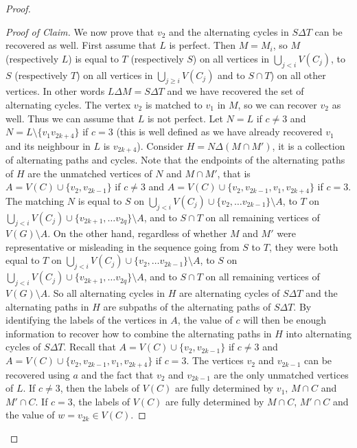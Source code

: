 \documentclass[11pt,a4paper]{article}
\theoremstyle{definition}
\newenvironment{poc}{\begin{proof}[Proof of
    Claim]\renewcommand*{\qedsymbol}{$\blacksquare$}}{\end{proof}}
\begin{document}
\begin{proof}
\begin{poc}
    We now prove that $v_2$ and the alternating cycles in $S \Delta T$ can be
    recovered as well. First assume that $L$ is perfect. Then $M = M_i$, so $M$
    (respectively $L$) is equal to $T$ (respectively $S$) on all vertices in
    $\bigcup_{j<i} V(C_j)$, to $S$ (respectively $T$) on all vertices in
    $\bigcup_{j\ge i} V(C_j)$ and to $S \cap T$) on all other vertices. In other
    words $L \Delta M = S \Delta T$ and we have recovered the set of alternating
    cycles. The vertex $v_2$ is matched to $v_1$ in $M$, so we can recover $v_2$
    as well. Thus we can assume that $L$ is not perfect. Let $N=L$ if $c \neq 3$
    and $N=L \setminus \{v_1v_{2k+4}\}$ if $c=3$ (this is well defined as we
    have already recovered $v_1$ and its neighbour in $L$ is
    $v_{2k+4}$). Consider $H = N\Delta (M \cap M')$, it is a collection of
    alternating paths and cycles. Note that the endpoints of the alternating
    paths of $H$ are the unmatched vertices of $N$ and $M \cap M'$, that is
    $A = V(C) \cup \{v_2,v_{2k-1}\}$ if $c \neq 3$ and
    $A = V(C) \cup \{v_2,v_{2k-1}, v_1, v_{2k+4}\}$ if $c=3$. The matching $N$
    is equal to $S$ on
    $\bigcup_{j<i} V(C_j) \cup \{v_2, \dots v_{2k-1}\} \setminus A$, to $T$ on
    $\bigcup_{j<i} V(C_j) \cup \{v_{2k+1}, \dots v_{2q}\} \setminus A$, and to
    $S \cap T$ on all remaining vertices of $V(G) \setminus A$. On the other
    hand, regardless of whether $M$ and $M'$ were representative or misleading
    in the sequence going from $S$ to $T$, they were both equal to $T$ on
    $\bigcup_{j<i} V(C_j) \cup \{v_2, \dots v_{2k-1}\} \setminus A$, to $S$ on
    $\bigcup_{j<i} V(C_j) \cup \{v_{2k+1}, \dots v_{2q}\} \setminus A$, and to
    $S \cap T$ on all remaining vertices of $V(G) \setminus A$. So all
    alternating cycles in $H$ are alternating cycles of $S \Delta T$ and the
    alternating paths in $H$ are subpaths of the alternating paths of
    $S \Delta T$. By identifying the labels of the vertices in $A$, the value of
    $c$ will then be enough information to recover how to combine the
    alternating paths in $H$ into alternating cycles of $S \Delta T$. Recall
    that $A = V(C) \cup \{v_2,v_{2k-1}\}$ if $c \neq 3$ and
    $A = V(C) \cup \{v_2,v_{2k-1}, v_1, v_{2k+4}\}$ if $c=3$. The vertices $v_2$ and $v_{2k-1}$ can be recovered
    using $a$ and the fact that $v_{2}$ and $v_{2k-1}$ are the only unmatched
    vertices of $L$. If $c \neq 3$, then the labels of $V(C)$ are fully
    determined by $v_1$, $M \cap C$ and $M'\cap C$. If $c=3$,
    the labels of $V(C)$ are fully determined by $M \cap C$, $M'\cap C$ and the
    value of $w = v_{2k} \in V(C)$.
    

\end{poc}
\end{proof}
\end{document}
